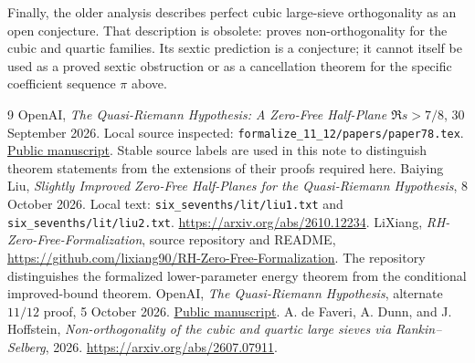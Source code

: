\documentclass[11pt]{article}
\begin{document}
Finally, the older analysis describes perfect cubic large-sieve
orthogonality as an open conjecture. That description is obsolete:
\cite{nonorth} proves non-orthogonality for the cubic and quartic families.
Its sextic prediction is a conjecture; it cannot itself be used as a
proved sextic obstruction or as a cancellation theorem for the specific
coefficient sequence $\pi$ above.

\begin{thebibliography}{9}
 OpenAI,
\emph{The Quasi-Riemann Hypothesis: A Zero-Free Half-Plane
$\Re s>7/8$}, 30 September 2026.
Local source inspected: \texttt{formalize\_11\_12/papers/paper78.tex}.
\href{https://github.com/openai/math/blob/main/preprints/The-Quasi-Riemann-Hypothesis-September-30-2026/paper.pdf}{Public manuscript}.
Stable source labels are used in this note to distinguish theorem statements
from the extensions of their proofs required here.
 Baiying Liu,
\emph{Slightly Improved Zero-Free Half-Planes for the Quasi-Riemann
Hypothesis}, 8 October 2026. Local text:
\texttt{six\_sevenths/lit/liu1.txt} and
\texttt{six\_sevenths/lit/liu2.txt}.
\url{https://arxiv.org/abs/2610.12234}.
 LiXiang,
\emph{RH-Zero-Free-Formalization}, source repository and README,
\url{https://github.com/lixiang90/RH-Zero-Free-Formalization}.
The repository distinguishes the formalized lower-parameter energy
theorem from the conditional improved-bound theorem.
 OpenAI, \emph{The Quasi-Riemann Hypothesis},
alternate $11/12$ proof, 5 October 2026.
\href{https://github.com/openai/math/blob/main/preprints/The-Quasi-Riemann-Hypothesis-October-5-2026/paper2.pdf}{Public manuscript}.
 A. de Faveri, A. Dunn, and J. Hoffstein,
\emph{Non-orthogonality of the cubic and quartic large sieves via
Rankin--Selberg}, 2026. \url{https://arxiv.org/abs/2607.07911}.
\end{thebibliography}
\end{document}
